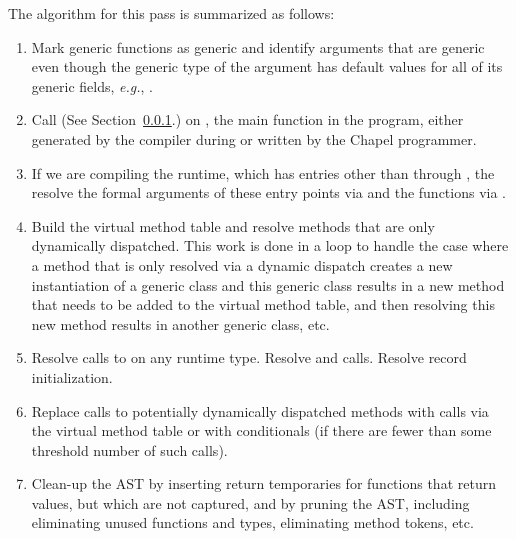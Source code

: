 \documentclass[10pt]{article}
\newcommand{\eg}{\emph{e.g.}}
\begin{document}
The algorithm for this pass is summarized as follows:
\begin{enumerate}
\item Mark generic functions as generic and identify arguments that
  are generic even though the generic type of the argument has default
  values for all of its generic fields, \eg, .
\item Call  (See Section~\ref{sec:resolveFns}.) on
  , the main function in the program, either generated
  by the compiler during  or written by the
  Chapel programmer.
\item If we are compiling the runtime, which has entries other than
  through , the resolve the formal arguments of these entry
  points via  and the functions via
  .
\item Build the virtual method table and resolve methods that are only
  dynamically dispatched.  This work is done in a loop to handle the
  case where a method that is only resolved via a dynamic dispatch
  creates a new instantiation of a generic class and this generic
  class results in a new method that needs to be added to the virtual
  method table, and then resolving this new method results in another
  generic class, etc.
\item Resolve calls to  on any
  runtime type.  Resolve  and  calls.
  Resolve record initialization.
\item Replace calls to potentially dynamically dispatched methods with
  calls via the virtual method table or with conditionals (if there
  are fewer than some threshold number of such calls).
\item Clean-up the AST by inserting return temporaries for functions
  that return values, but which are not captured, and by pruning the
  AST, including eliminating unused functions and types, eliminating
  method tokens, etc.
\end{enumerate}

\subsubsection{}
\label{sec:resolveFns}
\end{document}
